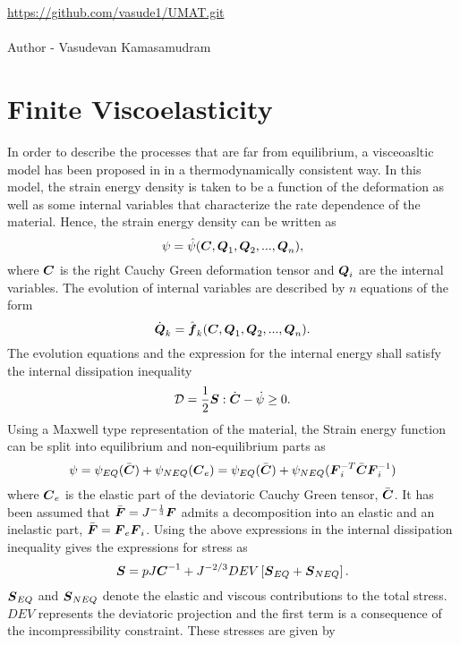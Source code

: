 \documentclass[11pt,twoside,TimesRoman]{article}
\author{Vasudevan }
\begin{document}
\href{https://github.com/vasude1/UMAT.git}{https://github.com/vasude1/UMAT.git}\\
\\
Author - Vasudevan Kamasamudram
\section{Finite Viscoelasticity}
In order to describe the processes that are far from equilibrium, a visceoasltic model has been proposed in \cite{Bergstrom1998, Reese1998} in a thermodynamically consistent way. In this model, the strain energy density is taken to be a function of the deformation as well as some internal variables that characterize the rate dependence of the material. Hence, the strain energy density can be written as 
\begin{equation}
\psi = \hat{\psi}(\mbox{\boldmath $C$},\mbox{\boldmath $Q$}_1,\mbox{\boldmath $Q$}_2,...,\mbox{\boldmath $Q$}_n),
\end{equation}
where $\mbox{\boldmath $C$}$ is the right Cauchy Green deformation tensor and $\mbox{\boldmath $Q$}_i$ are the internal variables. The evolution of internal variables are described by $n$ equations of the form
\begin{equation}
\dot{\mbox{\boldmath $Q$}}_k = \hat{\mbox{\boldmath $f$}}_k(\mbox{\boldmath $C$},\mbox{\boldmath $Q$}_1,\mbox{\boldmath $Q$}_2,...,\mbox{\boldmath $Q$}_n).
\end{equation}
The evolution equations and the expression for the internal energy shall satisfy the internal dissipation inequality 
\begin{equation}
\mathcal{D} = \frac{1}{2}\mbox{\boldmath $S$}:\dot{\mbox{\boldmath $C$}} - \dot{\psi} \geq 0.
\end{equation}
Using a Maxwell type representation of the material, the Strain energy function can be split into equilibrium and non-equilibrium parts as
\begin{equation}
\psi = {\psi}_{EQ} (\bar{\mbox{\boldmath $C$}}) + {\psi}_{NEQ}(\mbox{\boldmath $C$}_e) = {\psi}_{EQ} (\bar{\mbox{\boldmath $C$}}) + {\psi}_{NEQ}(\mbox{\boldmath $F$}_i^{-T}\bar{\mbox{\boldmath $C$}} \mbox{\boldmath $F$}_i^{-1} )
\end{equation}
where $\mbox{\boldmath $C$}_e$ is the elastic part of the deviatoric Cauchy Green tensor, $\bar{\mbox{\boldmath $C$}}$. It has been assumed that $\bar{\mbox{\boldmath $F$}} = J^{-\frac{1}{3}} \mbox{\boldmath $F$}$ admits a decomposition into an elastic and an inelastic part, $\bar{\mbox{\boldmath $F$}} = \mbox{\boldmath $F$}_e \mbox{\boldmath $F$}_i$.
Using the above expressions in the internal dissipation inequality gives the expressions for stress as 
\begin{equation}
\mbox{\boldmath $S$} = pJ\mbox{\boldmath $C$}^{-1} + J^{-2/3}DEV\left[\mbox{\boldmath $S$}_{EQ} + \mbox{\boldmath $S$}_{NEQ} \right].
\end{equation}
$\mbox{\boldmath $S$}_{EQ}$ and $\mbox{\boldmath $S$}_{NEQ}$ denote the elastic and viscous contributions to the total stress. $DEV$ represents the deviatoric projection and the first term is a consequence of the incompressibility constraint. These stresses are given by  
\end{document}
